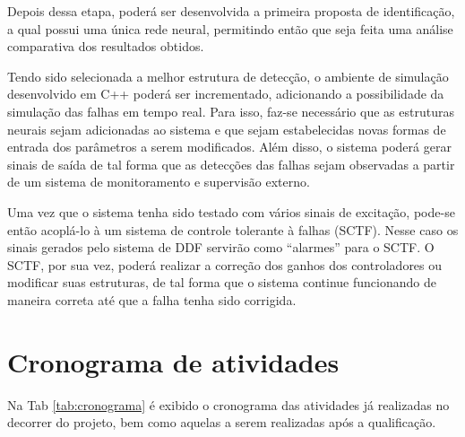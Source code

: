 Depois dessa etapa, poderá ser desenvolvida a primeira proposta de
identificação, a qual possui uma única rede neural, permitindo então que seja
feita uma análise comparativa dos resultados obtidos.

Tendo sido selecionada a melhor estrutura de detecção, o ambiente de simulação
desenvolvido em C++ poderá ser incrementado, adicionando a possibilidade da
simulação das falhas em tempo real. Para isso, faz-se necessário que as
estruturas neurais sejam adicionadas ao sistema e que sejam estabelecidas novas
formas de entrada dos parâmetros a serem modificados. Além disso, o sistema
poderá gerar sinais de saída de tal forma que as detecções das falhas sejam
observadas a partir de um sistema de monitoramento e supervisão externo. 

Uma vez que o sistema tenha sido testado com vários sinais de excitação, pode-se
então acoplá-lo à um sistema de controle tolerante à falhas (SCTF). Nesse caso
os sinais gerados pelo sistema de DDF servirão como ``alarmes'' para o SCTF. O
SCTF, por sua vez, poderá realizar a correção dos ganhos dos controladores ou
modificar suas estruturas, de tal forma que o sistema continue funcionando de
maneira correta até que a falha tenha sido corrigida.


\section{Cronograma de atividades}
Na Tab \ref{tab:cronograma} é exibido o cronograma das atividades já realizadas
no decorrer do projeto, bem como aquelas a serem realizadas após a qualificação.

\begin{comment}
\begin{table}[htb]
\centering
\caption{Cronograma de atividades do projeto.}
\label{tab:cronograma}
\vspace{0.25cm}
\begin{tabular}{c|cccccccccccc|cccccccccccc|cccccccccccc|}
\hline
\hline
\hline
\end{tabular}
\end{table}
\end{comment}
